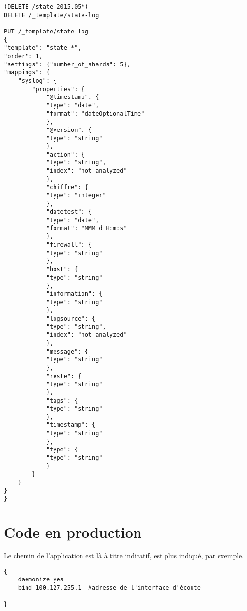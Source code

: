 \begin{lstlisting}[style=code,label={lst:mappingput2},caption={Ajouter un template de mapping}]
(DELETE /state-2015.05*)
DELETE /_template/state-log

PUT /_template/state-log
{
"template": "state-*",
"order": 1,
"settings": {"number_of_shards": 5},
"mappings": {
    "syslog": {
        "properties": {
            "@timestamp": {
            "type": "date",
            "format": "dateOptionalTime"
            },
            "@version": {
            "type": "string"
            },
            "action": {
            "type": "string",
            "index": "not_analyzed"
            },
            "chiffre": {
            "type": "integer"
            },
            "datetest": {
            "type": "date",
            "format": "MMM d H:m:s"              
            },
            "firewall": {
            "type": "string"
            },
            "host": {
            "type": "string"
            },
            "information": {
            "type": "string"
            },
            "logsource": {
            "type": "string",
            "index": "not_analyzed"
            },
            "message": {
            "type": "string"
            },
            "reste": {
            "type": "string"
            },
            "tags": {
            "type": "string"
            },
            "timestamp": {
            "type": "string"
            },
            "type": {
            "type": "string"
            }
        }
    }
}
}
\end{lstlisting}
\label{lst:mappingput2}

\section{Code en production}
\label{sec:codeprod}



Le chemin de l'application est là à titre indicatif,  est plus 
indiqué, par exemple.






\begin{lstlisting}[style=code,label={lst:configredis},caption={configuration dans /etc/redis/redis.conf}]
{
    daemonize yes
    bind 100.127.255.1  #adresse de l'interface d'écoute

}
\end{lstlisting}
